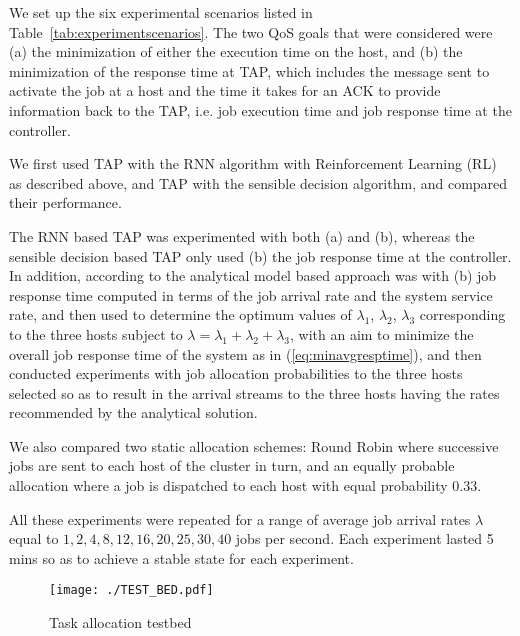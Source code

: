\documentclass[journal]{IEEEtran}
\begin{document}
We set up the six experimental scenarios listed in Table~\ref{tab:experimentscenarios}. The two QoS goals that were considered were (a) the minimization of either the execution time on the host, and (b) the minimization of the response
time at TAP, which includes the message sent to activate the job at a host and the time it takes for an ACK to provide information back to the TAP, i.e. job execution time and job response time at the controller. 

We first  used TAP with the RNN algorithm with Reinforcement Learning (RL) as described above, and TAP with the sensible decision algorithm, and compared their performance. 

The RNN based TAP was experimented with both (a) and (b), whereas the sensible decision based TAP only
used (b) the job response time at the controller.  In addition, according to the analytical model based approach was  with (b) job response time 
computed in terms of the job arrival rate and the system service rate, and then used to determine the optimum values of $\lambda_1$, $\lambda_2$, $\lambda_3$ 
corresponding to the three hosts subject to $\lambda=\lambda_1+\lambda_2+\lambda_3$, with an aim to minimize the overall job response time of the system as in (\ref{eq:minavgresptime}), and
then conducted experiments with job allocation probabilities to the three hosts selected
so as to result in the arrival streams to the three hosts having the rates recommended by the analytical solution. 

We also compared  two static allocation schemes: Round Robin where successive jobs are sent to each host of the cluster in turn, and an equally probable allocation where a job is dispatched to 
each host with equal probability $0.33$.

All these experiments were repeated for a range of average job arrival rates $\lambda$ equal to $1, 2, 4, 8, 12, 16, 20, 25, 30, 40$ jobs per second. Each experiment lasted 5 mins so as to achieve a stable state for each experiment.

		\begin{figure}[ht]
     \centering
      \texttt{[image: ./TEST\_BED.pdf]} \caption{Task allocation testbed}
     \label{fig:testbed}
    \end{figure}
		
\end{document}
